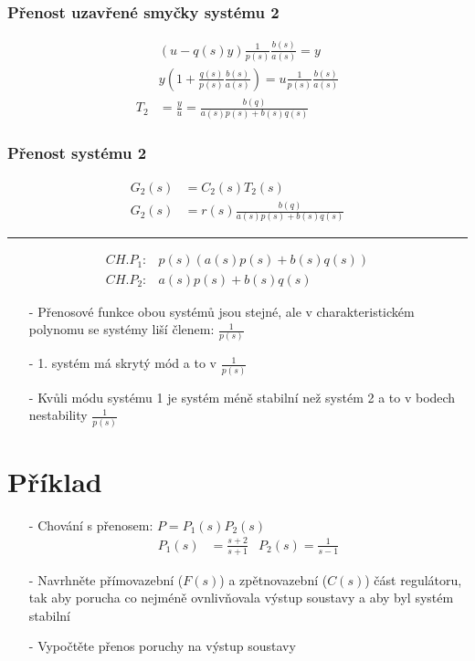 \documentclass{article}
\begin{document}
\subsubsection{Přenost uzavřené smyčky systému 2}
\begin{align*}
    & (u-q(s)y)\frac{1}{p(s)}\frac{b(s)}{a(s)} = y\\
    & y(1+\frac{q(s)}{p(s)}\frac{b(s)}{a(s)}) = u\frac{1}{p(s)}\frac{b(s)}{a(s)}\\
    T_2 &= \frac{y}{u} = \frac{b(q)}{a(s)p(s)+b(s)q(s)}
\end{align*}

\subsubsection{Přenost systému 2}
\begin{align*}
    G_2(s) &= C_2(s)T_2(s)\\
    G_2(s) &= r(s)\frac{b(q)}{a(s)p(s)+b(s)q(s)}
\end{align*}



\vspace{4pt}
    \hrule
\vspace{4pt}
  

\begin{align*}
    CH.P_1: & p(s)(a(s)p(s)+b(s)q(s))\\
    CH.P_2: & a(s)p(s)+b(s)q(s)
\end{align*}


\begin{itemize}
    \item[-] Přenosové funkce obou systémů jsou stejné, ale v charakteristickém polynomu se systémy liší členem: $\frac{1}{p(s)}$
    \item[-] 1. systém má skrytý mód a to v $\frac{1}{p(s)}$
    \item[-] Kvůli módu systému 1 je systém méně stabilní než systém 2 a to v bodech nestability $\frac{1}{p(s)}$
\end{itemize}


\newpage
\section{Příklad}
\begin{itemize}
    \item[-] Chování s přenosem: $P = P_1(s)P_2(s)$
    \begin{align*}
        P_1(s) &= \frac{s+2}{s+1}
        & P_2(s) = \frac{1}{s-1}
    \end{align*}
    \item[-] Navrhněte přímovazební ($F(s)$) a zpětnovazební ($C(s)$) část regulátoru, tak aby porucha co nejméně ovnlivňovala výstup soustavy a aby byl systém stabilní
    \item[-] Vypočtěte přenos poruchy na výstup soustavy
\end{itemize}
\end{document}

